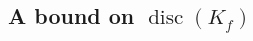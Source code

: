 \documentclass[11pt,letterpaper,reqno]{amsart}
\newtheorem{proposition}[theorem]{Proposition}
\theoremstyle{definition}
\numberwithin{equation}{section}
\numberwithin{figure}{section}
\numberwithin{table}{section}
\let\subsectiontemp\subsection
\renewcommand{\subsection}[1]{ 
    \subsectiontemp{#1} \hfill\vspace{0.5\linespacing} 
}
\newcommand{\nw}{\mathrm{new}}
\begin{document}

\subsection{A bound on \texorpdfstring{$\operatorname{disc}(K_f)$}{disc(Kf)}}\label{subsection:discriminant-bound}
\end{document}
